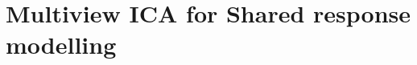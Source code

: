 \documentclass[12pt]{report}
\begin{document}

%
%
%
%
%
\section{Multiview ICA for Shared response modelling}
\label{sec:mvica}
\end{document}
